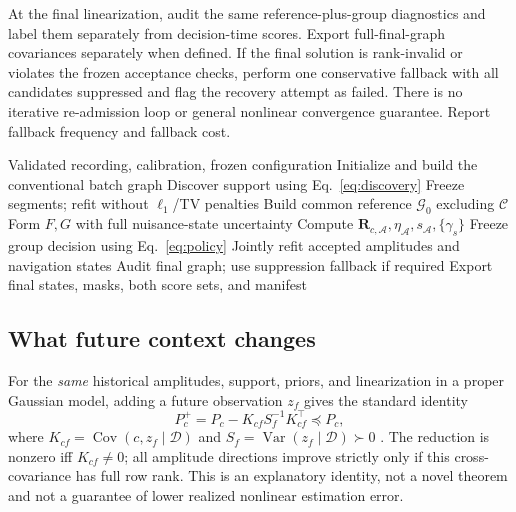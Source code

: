 \documentclass[conference]{IEEEtran}
\newcommand{\C}{\mathcal C}
\newcommand{\A}{\mathcal A}
\newcommand{\Rc}{\mathbf R}
\newcommand{\Var}{\operatorname{Var}}
\newcommand{\Cov}{\operatorname{Cov}}
\begin{document}
At the final linearization, audit the same reference-plus-group diagnostics and label them separately from decision-time scores. Export full-final-graph covariances separately when defined. If the final solution is rank-invalid or violates the frozen acceptance checks, perform one conservative fallback with all candidates suppressed and flag the recovery attempt as failed. There is no iterative re-admission loop or general nonlinear convergence guarantee. Report fallback frequency and fallback cost.

\begin{algorithm}[t]
\caption{Four-stage NLOS module within UWB-IMU-IE}
\label{alg:module}
\begin{algorithmic}[1]
\Require Validated recording, calibration, frozen configuration
\State Initialize and build the conventional batch graph
\State Discover support using Eq.~\eqref{eq:discovery}
\State Freeze segments; refit without $\ell_1$/TV penalties
\State Build common reference $\mathcal G_0$ excluding $\C$
\For{each eligible overlap group $\A$}
 \State Form $F,G$ with full nuisance-state uncertainty
 \State Compute $\Rc_{c,\A},\eta_\A,s_\A,\{\gamma_s\}$
 \State Freeze group decision using Eq.~\eqref{eq:policy}
\EndFor
\State Jointly refit accepted amplitudes and navigation states
\State Audit final graph; use suppression fallback if required
\State Export final states, masks, both score sets, and manifest
\end{algorithmic}
\end{algorithm}

\subsection{What future context changes}
\label{sec:future_analysis}
For the \emph{same} historical amplitudes, support, priors, and linearization in a proper Gaussian model, adding a future observation $z_f$ gives the standard identity
\begin{equation}
 P_c^+=P_c-K_{cf}S_f^{-1}K_{cf}^\top\preceq P_c,
 \label{eq:future}
\end{equation}
where $K_{cf}=\Cov(c,z_f\mid\mathcal D)$ and $S_f=\Var(z_f\mid\mathcal D)\succ0$ \cite{paskin2002}. The reduction is nonzero iff $K_{cf}\neq0$; all amplitude directions improve strictly only if this cross-covariance has full row rank. This is an explanatory identity, not a novel theorem and not a guarantee of lower realized nonlinear estimation error.
\end{document}
